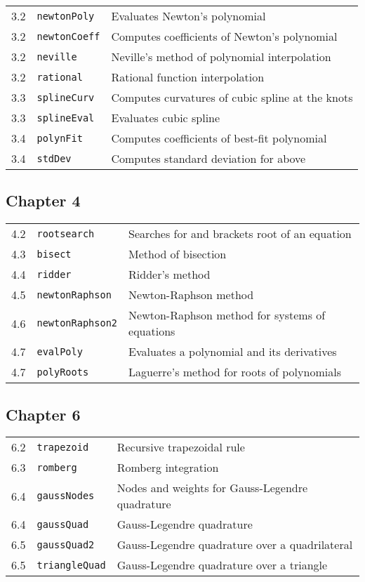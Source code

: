 \begin{tabular}{lll}
3.2 & \texttt{newtonPoly} & Evaluates Newton's polynomial \\ 
3.2 & \texttt{newtonCoeff} & Computes coefficients of Newton's polynomial \\ 
3.2 & \texttt{neville} & Neville's method of polynomial interpolation \\ 
3.2 & \texttt{rational} & Rational function interpolation \\ 
3.3 & \texttt{splineCurv} & Computes curvatures of cubic spline at the knots
\\ 
3.3 & \texttt{splineEval} & Evaluates cubic spline \\ 
3.4 & \texttt{polynFit} & Computes coefficients of best-fit polynomial \\ 
3.4 & \texttt{stdDev} & Computes standard deviation for above%
\end{tabular}

\subsection{Chapter 4}

\begin{tabular}{lll}
4.2 & \texttt{rootsearch} & Searches for and brackets root of an equation \\ 
4.3 & \texttt{bisect} & Method of bisection \\ 
4.4 & \texttt{ridder} & Ridder's method \\ 
4.5 & \texttt{newtonRaphson} & Newton-Raphson method \\ 
4.6 & \texttt{newtonRaphson2} & Newton-Raphson method for systems of
equations \\ 
4.7 & \texttt{evalPoly} & Evaluates a polynomial and its derivatives \\ 
4.7 & \texttt{polyRoots} & Laguerre's method for roots of polynomials%
\end{tabular}

\subsection{Chapter 6}

\begin{tabular}{lll}
6.2 & \texttt{trapezoid} & Recursive trapezoidal rule \\ 
6.3 & \texttt{romberg} & Romberg integration \\ 
6.4 & \texttt{gaussNodes} & Nodes and weights for Gauss-Legendre quadrature
\\ 
6.4 & \texttt{gaussQuad} & Gauss-Legendre quadrature \\ 
6.5 & \texttt{gaussQuad2} & Gauss-Legendre quadrature over a quadrilateral
\\ 
6.5 & \texttt{triangleQuad} & Gauss-Legendre quadrature over a triangle%
\end{tabular}


